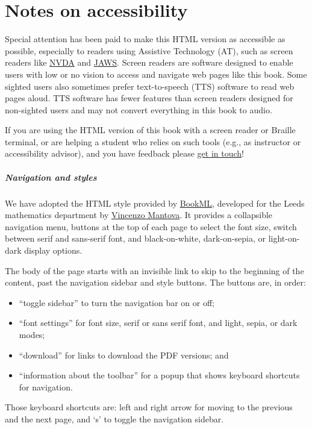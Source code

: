 
\chapter{Notes on accessibility}

Special attention has been paid to make this HTML version as
accessible as possible, especially to readers using Assistive
Technology (AT), such as screen readers like
\href{https://www.nvaccess.org/download/}{NVDA}
and
\href{https://www.freedomscientific.com/products/software/jaws/}{JAWS}.
Screen readers are software designed to enable users with low or no
vision to access and navigate web pages like this book. Some sighted
users also sometimes prefer text-to-speech (TTS) software to read web
pages aloud. TTS software has fewer features than screen readers
designed for non-sighted users and may not convert everything in this
book to audio.

If you are using the HTML version of this book with a screen reader or
Braille terminal, or are helping a student who relies on such tools
(e.g., as instructor or accessibility advisor), and you have feedback
please \href{mailto:rzach@ucalgary.ca}{get in touch}!

\paragraph{Navigation and styles} We have adopted the HTML style
provided by \href{https://vlmantova.github.io/bookml/}{BookML},
developed for the Leeds mathematics department by
\href{https://eps.leeds.ac.uk/maths/staff/4058/dr-vincenzo-l-mantova}{Vincenzo
Mantova}. It provides a collapsible navigation menu, buttons at the
top of each page to select the font size, switch between serif and
sans-serif font, and black-on-white, dark-on-sepia, or light-on-dark
display options.

The body of the page starts with an invisible link to skip to the
beginning of the content, past the navigation sidebar and style
buttons. The buttons are, in order: 
\begin{itemize}
  \item ``toggle sidebar'' to turn the navigation bar on or off;
  \item ``font settings'' for font size, serif or sans serif font, and
    light, sepia, or dark modes; 
  \item ``download'' for links to download the PDF versions; and 
  \item ``information about the toolbar'' for a popup that shows
    keyboard shortcuts for navigation.
\end{itemize}
Those keyboard shortcuts are: left and right arrow for moving to the
previous and the next page, and `s' to toggle the navigation sidebar.

